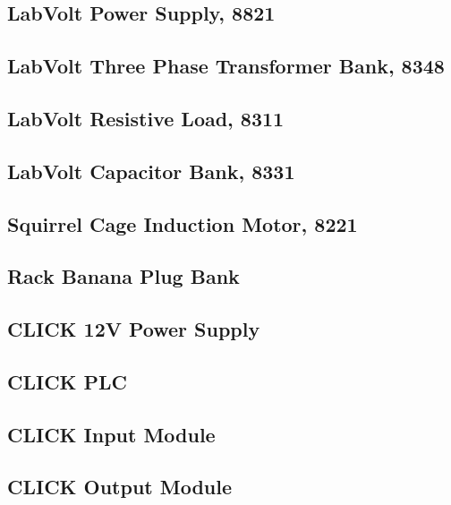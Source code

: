 \subsection{LabVolt Power Supply, 8821}

\newpage

\subsection{LabVolt Three Phase Transformer Bank, 8348}

\newpage

\subsection{LabVolt Resistive Load, 8311}

\newpage

\subsection{LabVolt Capacitor Bank, 8331}

\newpage

\subsection{Squirrel Cage Induction Motor, 8221}

\newpage

\subsection{Rack Banana Plug Bank}

\newpage

\subsection{CLICK 12V Power Supply}

\newpage

\subsection{CLICK PLC}

\newpage

\subsection{CLICK Input Module}

\newpage

\subsection{CLICK Output Module}

\newpage

